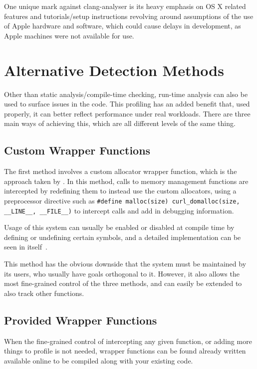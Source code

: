 One unique mark against clang-analyser is its heavy emphasis on OS X related features and tutorials/setup instructions revolving around assumptions of the use of Apple hardware and software, which could cause delays in development, as Apple machines were not available for use.

\section{Alternative Detection Methods}

Other than static analysis/compile-time checking, run-time analysis can also be used to surface issues in the code. This profiling has an added benefit that, used properly, it can better reflect performance under real workloads. There are three main ways of achieving this, which are all different levels of the same thing.

\subsection{Custom Wrapper Functions}

The first method involves a custom allocator wrapper function, which is the approach taken by . In this method, calls to memory management functions are intercepted by redefining them to instead use the custom allocators, using a preprocessor directive such as \texttt{\#define malloc(size) curl\_domalloc(size, \_\_LINE\_\_, \_\_FILE\_\_)} to intercept calls and add in debugging information.

Usage of this system can usually be enabled or disabled at compile time by defining or undefining certain symbols, and a detailed implementation can be seen in  itself~\cite{curlallocator}.

This method has the obvious downside that the system must be maintained by its users, who usually have goals orthogonal to it. However, it also allows the most fine-grained control of the three methods, and can easily be extended to also track other functions.

\subsection{Provided Wrapper Functions}

When the fine-grained control of intercepting any given function, or adding more things to profile is not needed, wrapper functions can be found already written available online to be compiled along with your existing code.


